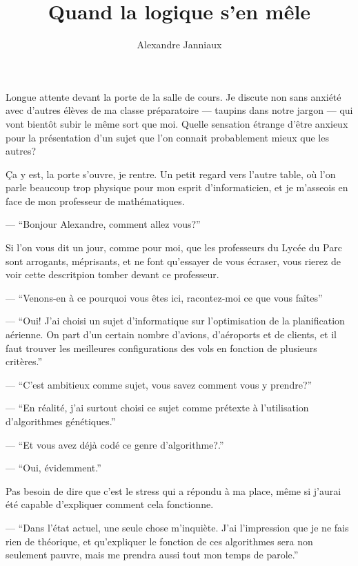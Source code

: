 \documentclass[letterpaper, 12pt]{report} %
\title{Quand la logique s'en mêle}
\author{Alexandre Janniaux}
\begin{document}
  \doublespacing{}

  \maketitle

  
  
{\vspace{0pt}
Longue attente devant la porte de la salle de cours. 
Je discute non sans anxiété avec d'autres élèves de ma classe préparatoire --- taupins dans notre jargon --- qui vont bientôt subir le même sort que moi.
Quelle sensation étrange d'être anxieux pour la présentation d'un sujet que l'on connait probablement mieux que les autres?

Ça y est, la porte s'ouvre, je rentre. Un petit regard vers l'autre table, où l'on parle beaucoup trop physique pour mon esprit d'informaticien, et je m'asseois en face de mon professeur de mathématiques.

--- ``Bonjour Alexandre, comment allez vous?''

Si l'on vous dit un jour, comme pour moi, que les professeurs du Lycée du Parc sont arrogants, méprisants, et ne font qu'essayer de vous écraser, vous rierez de voir cette descritpion tomber devant ce professeur.


--- ``Venons-en à ce pourquoi vous êtes ici, racontez-moi ce que vous faîtes''

--- ``Oui! J'ai choisi un sujet d'informatique sur l'optimisation de la planification aérienne. On part d'un certain nombre d'avions, d'aéroports et de clients, et il faut trouver les meilleures configurations des vols en fonction de plusieurs critères.''

--- ``C'est ambitieux comme sujet, vous savez comment vous y prendre?'' %

--- ``En réalité, j'ai surtout choisi ce sujet comme prétexte à l'utilisation d'algorithmes génétiques.''

--- ``Et vous avez déjà codé ce genre d'algorithme?.''

--- ``Oui, évidemment.''

Pas besoin de dire que c'est le stress qui a répondu à ma place, même si j'aurai été capable d'expliquer comment cela fonctionne. 

--- ``Dans l'état actuel, une seule chose m'inquiète. 
		J'ai l'impression que je ne fais rien de théorique, et qu'expliquer le fonction de ces algorithmes sera non seulement pauvre, mais me prendra aussi tout mon temps de parole.''

}
\end{document}
